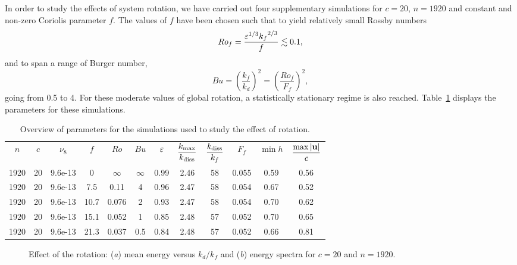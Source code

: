 


In order to study the effects of system rotation, we have carried
out four supplementary simulations for $c = 20$, $n = 1920$ and
constant and non-zero Coriolis parameter $f$.  The values of $f$ have
been chosen such that to yield relatively small Rossby numbers
\begin{equation}
Ro_f = \frac{\varepsilon^{1/3} {k_f}^{2/3}}{f} \lesssim 0.1,
\end{equation}
and to span a range of Burger number,
\begin{equation}
Bu = \left(\frac{k_f}{k_d}\right)^2 = \left(\frac{Ro_f}{F_f}\right)^2,
\end{equation}
going from 0.5 to 4.  For these moderate values of global rotation, a
statistically stationary regime is also reached.  Table~\ref{tab_rot}
displays the parameters for these simulations.
\begin{table}
\begin{center}
\begin{tabular}{cc@{\hskip 8mm}c@{\hskip 8mm}ccc@{\hskip 8mm}cccc@{\hskip 8mm}cc}
$n$ & $c$ & $\nu_8$ & $f$ & $Ro$ & $Bu$ & $\varepsilon$ & $\displaystyle\frac{\kmax}{\kdiss}$ & $\displaystyle\frac{\kdiss}{k_f}$ & $F_f$ & $\min h$ & $\displaystyle\frac{\max |\textbf{u}|}{c}$ \\[3mm]
1920 &   20 & 9.6e-13 &  0   &  $\infty$ & $\infty$ & 0.99 & 2.46 &  58 &  0.055 & 0.59 & 0.56 \\
1920 &   20 & 9.6e-13 &  7.5 &   0.11 &      4 & 0.96 & 2.47 &  58 &  0.054 & 0.67 & 0.52 \\
1920 &   20 & 9.6e-13 & 10.7 &  0.076 &      2 & 0.93 & 2.47 &  58 &  0.054 & 0.70 & 0.62 \\
1920 &   20 & 9.6e-13 & 15.1 &  0.052 &      1 & 0.85 & 2.48 &  57 &  0.052 & 0.70 & 0.65 \\
1920 &   20 & 9.6e-13 & 21.3 &  0.037 &    0.5 & 0.84 & 2.48 &  57 &  0.052 & 0.66 & 0.81 \\
\end{tabular}
\caption{Overview of parameters for the simulations used to study the effect of rotation. 
}
\label{tab_rot}
\end{center}
\end{table}



\begin{figure}
\caption{Effect of the rotation: (\textit{a}) mean energy versus
$k_d/k_f$ and (\textit{b}) energy spectra for $c = 20$ and $n =
1920$.}
\label{fig_effectBu}
\end{figure}

